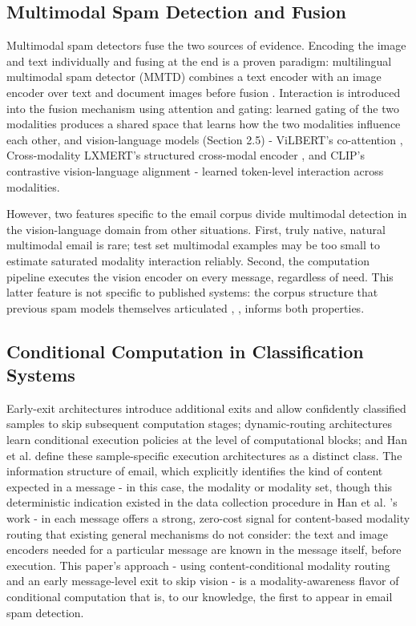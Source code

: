 \documentclass[10pt,twoside]{article}
\begin{document}
\subsection{Multimodal Spam Detection and Fusion}\label{sec:3.3}

Multimodal spam detectors fuse the two sources of evidence. Encoding the image and text individually and fusing at the end is a proven paradigm: multilingual multimodal spam detector (MMTD) combines a text encoder with an image encoder over text and document images before fusion \citep{zhang2023mmtd}. Interaction is introduced into the fusion mechanism using attention \citep{arevalo2017gmu} and gating: learned gating of the two modalities produces a shared space that learns how the two modalities influence each other, and vision-language models (Section 2.5) - ViLBERT's co-attention \citep{lu2019vilbert}, Cross-modality LXMERT's structured cross-modal encoder \citep{tan2019lxmert}, and CLIP's contrastive vision-language alignment \citep{radford2021clip} - learned token-level interaction across modalities.

However, two features specific to the email corpus divide multimodal detection in the vision-language domain from other situations. First, truly native, natural multimodal email is rare; test set multimodal examples may be too small to estimate saturated modality interaction reliably. Second, the computation pipeline executes the vision encoder on every message, regardless of need. This latter feature is not specific to published systems: the corpus structure that previous spam models themselves articulated \citep{janez2023review}, \citep{annadatha2018image}, \citep{zhang2023mmtd} informs both properties.

\subsection{Conditional Computation in Classification Systems}\label{sec:3.4}

Early-exit architectures introduce additional exits and allow confidently classified samples to skip subsequent computation stages; dynamic-routing architectures learn conditional execution policies at the level of computational blocks; and Han et al. \citep{han2022dynamicsurvey} define these sample-specific execution architectures as a distinct class. The information structure of email, which explicitly identifies the kind of content expected in a message - in this case, the modality or modality set, though this deterministic indication existed in the data collection procedure in Han et al. \citep{han2022dynamicsurvey}'s work - in each message offers a strong, zero-cost signal for content-based modality routing that existing general mechanisms do not consider: the text and image encoders needed for a particular message are known in the message itself, before execution. This paper's approach - using content-conditional modality routing and an early message-level exit to skip vision - is a modality-awareness flavor of conditional computation that is, to our knowledge, the first to appear in email spam detection.
\end{document}
